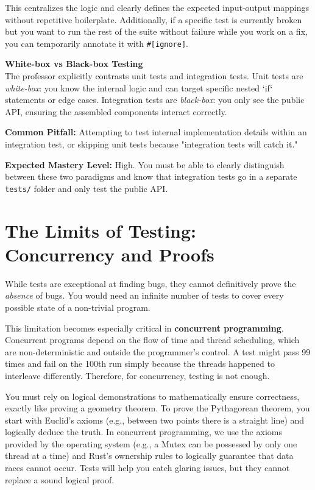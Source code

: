 This centralizes the logic and clearly defines the expected input-output mappings without repetitive boilerplate. Additionally, if a specific test is currently broken but you want to run the rest of the suite without failure while you work on a fix, you can temporarily annotate it with \texttt{\#[ignore]}.

\begin{examprioritybox}
\textbf{White-box vs Black-box Testing}\\
The professor explicitly contrasts unit tests and integration tests. Unit tests are \textit{white-box}: you know the internal logic and can target specific nested `if` statements or edge cases. Integration tests are \textit{black-box}: you only see the public API, ensuring the assembled components interact correctly. 

\textbf{Common Pitfall:} Attempting to test internal implementation details within an integration test, or skipping unit tests because "integration tests will catch it."

\textbf{Expected Mastery Level:} High. You must be able to clearly distinguish between these two paradigms and know that integration tests go in a separate \texttt{tests/} folder and only test the public API.
\end{examprioritybox}

\section{The Limits of Testing: Concurrency and Proofs}

While tests are exceptional at finding bugs, they cannot definitively prove the \textit{absence} of bugs. You would need an infinite number of tests to cover every possible state of a non-trivial program.

This limitation becomes especially critical in \textbf{concurrent programming}. Concurrent programs depend on the flow of time and thread scheduling, which are non-deterministic and outside the programmer's control. A test might pass 99 times and fail on the 100th run simply because the threads happened to interleave differently. Therefore, for concurrency, testing is not enough. 

You must rely on logical demonstrations to mathematically ensure correctness, exactly like proving a geometry theorem. To prove the Pythagorean theorem, you start with Euclid's axioms (e.g., between two points there is a straight line) and logically deduce the truth. In concurrent programming, we use the axioms provided by the operating system (e.g., a Mutex can be possessed by only one thread at a time) and Rust's ownership rules to logically guarantee that data races cannot occur. Tests will help you catch glaring issues, but they cannot replace a sound logical proof.

